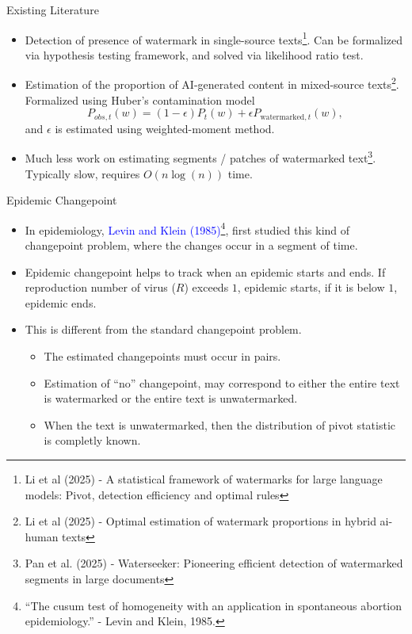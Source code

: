 \documentclass{beamer}
\begin{document}
\begin{frame}{Existing Literature}

    \begin{itemize}
        \item Detection of presence of watermark in single-source texts\footnote{\tiny Li et al (2025) - A statistical framework of watermarks for large language models: Pivot, detection efficiency and optimal rules}. Can be formalized via hypothesis testing framework, and solved via likelihood ratio test.
        \pause
        \item Estimation of the proportion of AI-generated content in mixed-source texts\footnote{\tiny Li et al (2025) - Optimal estimation of watermark proportions in hybrid ai-human texts}. Formalized using Huber's contamination model 
        \begin{equation*}
            P_{obs,t}(w) = (1-\epsilon)P_t(w) + \epsilon P_{\text{watermarked}, t}(w),
        \end{equation*}
        \noindent and $\epsilon$ is estimated using weighted-moment method.
        \pause
        \item Much less work on estimating segments / patches of watermarked text\footnote{\tiny Pan et al. (2025) - Waterseeker: Pioneering efficient detection of watermarked segments in large documents}. Typically slow, requires $O(n\log(n))$ time.
    \end{itemize}
\end{frame}


\begin{frame}{Epidemic Changepoint}
    \begin{itemize}
        \item In epidemiology, \textcolor{blue}{Levin and Klein (1985)}\footnote{\tiny``The cusum test of homogeneity with an application in spontaneous abortion epidemiology.'' - Levin and Klein, 1985.}, first studied this kind of changepoint problem, where the changes occur in a segment of time.
        \item \alert{Epidemic} changepoint helps to track when an epidemic starts and ends. If reproduction number of virus ($R$) exceeds $1$, epidemic starts, if it is below $1$, epidemic ends.
        \pause
        \item This is different from the standard changepoint problem.
        \begin{itemize}
            \item The estimated changepoints must occur in pairs.
            \item Estimation of ``no'' changepoint, may correspond to either \alert{the entire text is watermarked} or \alert{the entire text is unwatermarked}.
            \item When the text is unwatermarked, then the distribution of pivot statistic is \alert{completly known}.
        \end{itemize}
    \end{itemize}
\end{frame}
\end{document}
